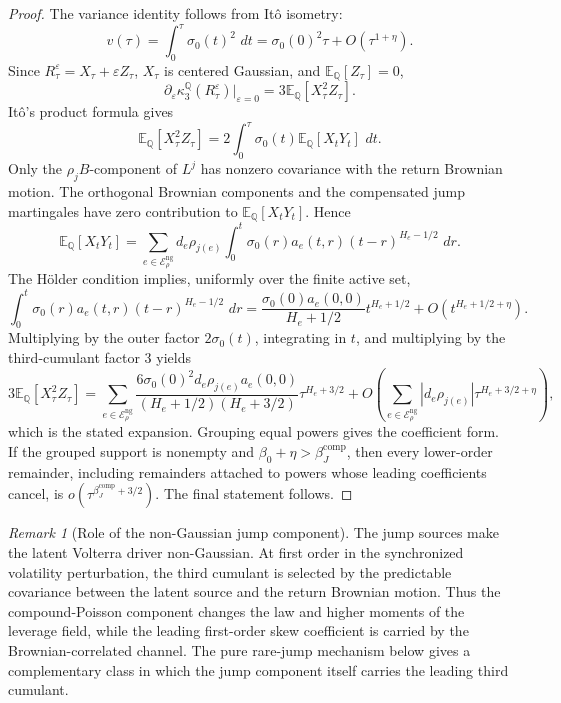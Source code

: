 \documentclass[11pt,a4paper]{amsart}
\theoremstyle{plain}
\theoremstyle{definition}
\theoremstyle{remark}
\newtheorem{remark}[theorem]{Remark}
\newcommand{\QQ}{\mathbb{Q}}
\newcommand{\EE}{\mathbb{E}}
\newcommand{\cE}{\mathcal{E}}
\newcommand{\dd}{\,d}
\begin{document}
\begin{proof}
The variance identity follows from It\^o isometry:
\[
        v(\tau)=\int_0^\tau \sigma_0(t)^2\,\dd t
        =\sigma_0(0)^2\tau+O(\tau^{1+\eta}).
\]
Since \(R_\tau^\varepsilon=X_\tau+\varepsilon Z_\tau\), \(X_\tau\) is centered Gaussian, and
\(\EE_\QQ[Z_\tau]=0\),
\[
        \partial_\varepsilon\kappa_3^\QQ(R_\tau^\varepsilon)\big|_{\varepsilon=0}
        =3\EE_\QQ[X_\tau^2Z_\tau].
\]
It\^o's product formula gives
\[
        \EE_\QQ[X_\tau^2Z_\tau]
        =
        2\int_0^\tau \sigma_0(t)\EE_\QQ[X_tY_t]\,\dd t .
\]
Only the \(\rho_jB\)-component of \(L^j\) has nonzero covariance with the return Brownian motion.
The orthogonal Brownian components and the compensated jump martingales have zero contribution to
\(\EE_\QQ[X_tY_t]\).  Hence
\[
        \EE_\QQ[X_tY_t]
        =
        \sum_{e\in\cE_\rho^{\mathrm{ng}}}
        d_e\rho_{j(e)}
        \int_0^t \sigma_0(r)a_e(t,r)(t-r)^{H_e-1/2}\,\dd r .
\]
The H\"older condition implies, uniformly over the finite active set,
\[
        \int_0^t \sigma_0(r)a_e(t,r)(t-r)^{H_e-1/2}\,\dd r
        =
        \frac{\sigma_0(0)a_e(0,0)}{H_e+1/2}t^{H_e+1/2}
        +O(t^{H_e+1/2+\eta}).
\]
Multiplying by the outer factor \(2\sigma_0(t)\), integrating in \(t\), and multiplying by the
third-cumulant factor \(3\) yields
\[
        3\EE_\QQ[X_\tau^2Z_\tau]
        =
        \sum_{e\in\cE_\rho^{\mathrm{ng}}}
        \frac{6\sigma_0(0)^2d_e\rho_{j(e)}a_e(0,0)}{(H_e+1/2)(H_e+3/2)}
        \tau^{H_e+3/2}
        +
        O\!\left(
                \sum_{e\in\cE_\rho^{\mathrm{ng}}}|d_e\rho_{j(e)}|\tau^{H_e+3/2+\eta}
        \right),
\]
which is the stated expansion.  Grouping equal powers gives the coefficient form.  If the grouped
support is nonempty and \(\beta_0+\eta>\beta_J^{\mathrm{comp}}\), then every lower-order
remainder, including remainders attached to powers whose leading coefficients cancel, is
\(o(\tau^{\beta_J^{\mathrm{comp}}+3/2})\).  The final statement follows.
\end{proof}

\begin{remark}[Role of the non-Gaussian jump component]\label{rem:ng-volterra-jump-role}
The jump sources make the latent Volterra driver non-Gaussian.  At first order in the synchronized
volatility perturbation, the third cumulant is selected by the predictable covariance between the
latent source and the return Brownian motion.  Thus the compound-Poisson component changes the law
and higher moments of the leverage field, while the leading first-order skew coefficient is carried
by the Brownian-correlated channel.  The pure rare-jump mechanism below gives a complementary class
in which the jump component itself carries the leading third cumulant.
\end{remark}
\end{document}
